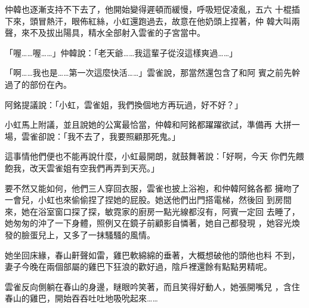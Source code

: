仲韓也逐漸支持不下去了，他開始變得遲頓而緩慢，呼吸短促凌亂，五六
十棍插下來，頭冒熱汗，眼佈紅絲，小虹還跑過去，故意在他奶頭上捏著，仲
韓大叫兩聲，來不及拔出陽具，精水全部射入雲雀的子宮當中。

「喔……喔……」仲韓說：「老天爺……我這輩子從沒這樣爽過……」

「啊……我也是……第一次這麼快活……」雲雀說，那當然還包含了和阿
賓之前先幹過了的部份在內。

阿銘提議說：「小虹，雲雀姐，我們換個地方再玩過，好不好？」

小虹馬上附議，並且說她的公寓最恰當，仲韓和阿銘都躍躍欲試，準備再
大拼一場，雲雀卻說：「我不去了，我要照顧那死鬼。」

這事情他們便也不能再說什麼，小虹最開朗，就鼓舞著說：「好啊，今天
你們先餵飽我，改天雲雀姐有空我們再弄到天亮。」

要不然又能如何，他們三人穿回衣服，雲雀也披上浴袍，和仲韓阿銘各都
擁吻了一會兒，小虹也來偷偷捏了捏她的屁股。她送他們出門搭電梯，然後回
到房間來，她在浴室窗口探了探，敏霓家的廚房一點光線都沒有，阿賓一定回
去睡了，她匆匆的沖了一下身體，照例又在鏡子前顧影自憐著，她自己都發現
，她容光煥發的臉蛋兒上，又多了一抹騷騷的風情。

她坐回床緣，春山鼾聲如雷，雞巴軟綿綿的垂著，大概想破他的頭他也料
不到，妻子今晚在兩個部屬的雞巴下狂浪的歡好過，陰戶裡還餘有點點男精呢。

雲雀反向側躺在春山的身邊，瞇眼吟笑著，而且笑得好動人，她張開嘴兒
，含住春山的雞巴，開始吞吞吐吐地吸吮起來……










